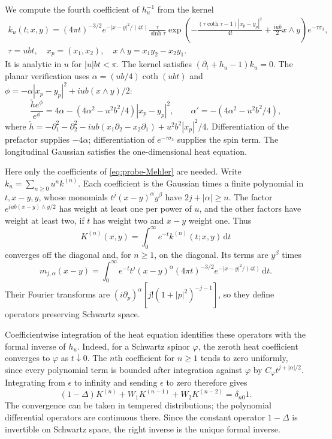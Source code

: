 \documentclass[11pt,letterpaper,reqno]{amsart}
\newcommand{\dd}{\mathrm d}
\begin{document}
We compute the fourth coefficient of $h_u^{-1}$ from the kernel
\begin{multline}\label{eq:probe-Mehler}
 k_u(t;x,y)=(4\pi t)^{-3/2}e^{-|x-y|^2/(4t)}
 \frac{\tau}{\sinh\tau}\exp\left(-\frac{(\tau\coth\tau-1)|x_p-y_p|^2}{4t}
                           +\frac{iub}{2}x\wedge y\right)
 e^{-\tau\sigma_3},\\
 \tau=ubt,\quad x_p=(x_1,x_2),\quad x\wedge y=x_1y_2-x_2y_1.
\end{multline}
It is analytic in $u$ for $|u|bt<\pi$. The kernel satisfies
$(\partial_t+h_u-1)k_u=0$. The planar verification uses
$\alpha=(ub/4)\coth(ubt)$ and
$\phi=-\alpha|x_p-y_p|^2+iub(x\wedge y)/2$:
\[
 \frac{\check h e^\phi}{e^\phi}
   =4\alpha-(4\alpha^2-u^2b^2/4)|x_p-y_p|^2,
 \qquad \alpha'=-(4\alpha^2-u^2b^2/4),
\]
where $\check h=-\partial_1^2-\partial_2^2
-iub(x_1\partial_2-x_2\partial_1)+u^2b^2|x_p|^2/4$.
Differentiation of the prefactor supplies $-4\alpha$; differentiation
of $e^{-\tau\sigma_3}$ supplies the spin term. The longitudinal
Gaussian satisfies the one-dimensional heat equation.

Here only the coefficients of \eqref{eq:probe-Mehler} are needed.
Write $k_u=\sum_{n\ge0}u^nk^{(n)}$. Each coefficient is the Gaussian
times a finite polynomial in $t,x-y,y$, whose monomials
$t^j(x-y)^\alpha y^\beta$ have $2j+|\alpha|\ge n$.
The factor $e^{iub(x-y)\wedge y/2}$ has weight at least one per
power of $u$, and the other factors have weight at least two,
if $t$ has weight two and $x-y$ weight one.
Thus
\[
 K^{(n)}(x,y)=\int_0^\infty e^{-t}k^{(n)}(t;x,y)\,\dd t
\]
converges off the diagonal and, for $n\ge1$, on the diagonal.
Its terms are $y^\beta$ times
\[
 m_{j,\alpha}(x-y)=\int_0^\infty e^{-t}t^j(x-y)^\alpha
                 (4\pi t)^{-3/2}e^{-|x-y|^2/(4t)}\,\dd t.
\]
Their Fourier transforms are
$(i\partial_p)^\alpha[j!(1+|p|^2)^{-j-1}]$, so they define
operators preserving Schwartz space.

Coefficientwise integration of the heat equation identifies these
operators with the formal inverse of $h_u$. Indeed, for a Schwartz
spinor $\varphi$, the zeroth heat coefficient converges to $\varphi$
as $t\downarrow0$. The $n$th coefficient for $n\ge1$ tends to zero
uniformly, since every polynomial term is bounded after integration
against $\varphi$ by $C_\varphi t^{j+|\alpha|/2}$.
Integrating from $\epsilon$ to infinity and sending $\epsilon$ to
zero therefore gives
\[
 (1-\Delta)K^{(n)}+W_1K^{(n-1)}+W_2K^{(n-2)}=\delta_{n0}1.
\]
The convergence can be taken in tempered distributions; the
polynomial differential operators are continuous there. Since the
constant operator $1-\Delta$ is invertible on Schwartz space, the
right inverse is the unique formal inverse.
\end{document}
